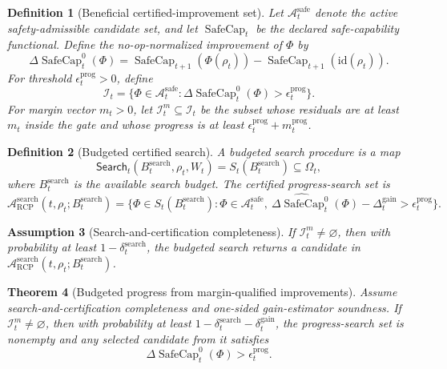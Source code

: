 \documentclass[11pt]{article}
\newtheorem{theorem}{Theorem}[section]
\newtheorem{definition}[theorem]{Definition}
\newtheorem{assumption}[theorem]{Assumption}
\newcommand{\Acal}{\mathcal{A}}
\newcommand{\id}{\mathrm{id}}
\newcommand{\1}{\mathbf{1}}
\newcommand{\RCP}{\mathrm{RCP}}
\newcommand{\safe}{\mathrm{safe}}
\providecommand{\Ical}{\mathcal{I}}
\providecommand{\SafeCap}{\operatorname{SafeCap}}
\begin{document}
\begin{definition}[Beneficial certified-improvement set]
\label{def:beneficial_certified_improvement_set_operational}
Let \(\Acal_t^{\safe}\) denote the active safety-admissible candidate set, and let \(\SafeCap_t\) be the declared safe-capability functional.  Define the no-op-normalized improvement of \(\Phi\) by
\[
\Delta\SafeCap_t^0(\Phi)
=
\SafeCap_{t+1}(\Phi(\rho_t))-
\SafeCap_{t+1}(\id(\rho_t)).
\]
For threshold \(\epsilon_t^{\mathrm{prog}}>0\), define
\[
\Ical_t
=
\{\Phi\in\Acal_t^{\safe}:\Delta\SafeCap_t^0(\Phi)>\epsilon_t^{\mathrm{prog}}\}.
\]
For margin vector \(m_t>0\), let \(\Ical_t^m\subseteq\Ical_t\) be the subset whose residuals are at least \(m_t\) inside the gate and whose progress is at least \(\epsilon_t^{\mathrm{prog}}+m_t^{\mathrm{prog}}\).
\end{definition}

\begin{definition}[Budgeted certified search]
\label{def:budgeted_certified_search_operational}
A budgeted search procedure is a map
\[
\mathsf{Search}_t(B_t^{\mathrm{search}},\rho_t,W_t)
=
S_t(B_t^{\mathrm{search}})\subseteq\Omega_t,
\]
where \(B_t^{\mathrm{search}}\) is the available search budget.  The certified progress-search set is
\[
\Acal_{\RCP}^{\mathrm{search}}(t,\rho_t;B_t^{\mathrm{search}})
=
\{\Phi\in S_t(B_t^{\mathrm{search}}):\Phi\in\Acal_t^{\safe},\ \widehat{\Delta\SafeCap_t^0}(\Phi)-\Delta_t^{\mathrm{gain}}>\epsilon_t^{\mathrm{prog}}\}.
\]
\end{definition}

\begin{assumption}[Search-and-certification completeness]
\label{ass:search_and_certification_completeness_operational}
If \(\Ical_t^m\ne\varnothing\), then with probability at least \(1-\delta_t^{\mathrm{search}}\), the budgeted search returns a candidate in \(\Acal_{\RCP}^{\mathrm{search}}(t,\rho_t;B_t^{\mathrm{search}})\).
\end{assumption}

\begin{theorem}[Budgeted progress from margin-qualified improvements]
\label{thm:budgeted_progress_from_margin_improvements}
Assume search-and-certification completeness and one-sided gain-estimator soundness.  If \(\Ical_t^m\ne\varnothing\), then with probability at least \(1-\delta_t^{\mathrm{search}}-\delta_t^{\mathrm{gain}}\), the progress-search set is nonempty and any selected candidate from it satisfies
\[
\Delta\SafeCap_t^0(\Phi)>\epsilon_t^{\mathrm{prog}}.
\]
\end{theorem}
\end{document}
